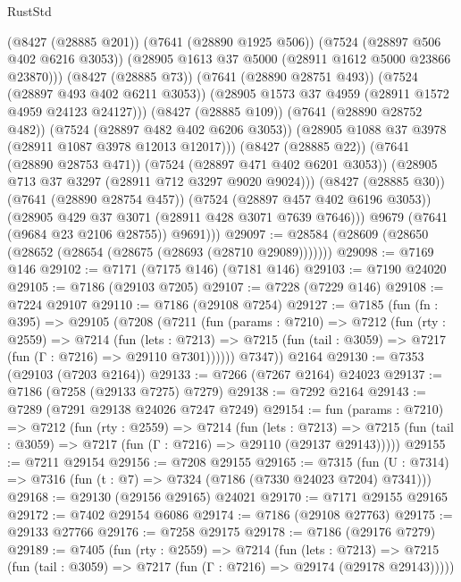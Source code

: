 \begin{lexlean}{RustStd}
\begin{coremodule}
                    (@8427 (@28885 @201))
                    (@7641 (@28890 @1925 @506))
                    (@7524 (@28897 @506 @402 @6216 @3053))
                    (@28905 @1613 @37 @5000 (@28911 @1612 @5000 @23866 @23870)))
                  (@8427 (@28885 @73))
                  (@7641 (@28890 @28751 @493))
                  (@7524 (@28897 @493 @402 @6211 @3053))
                  (@28905 @1573 @37 @4959 (@28911 @1572 @4959 @24123 @24127)))
                (@8427 (@28885 @109))
                (@7641 (@28890 @28752 @482))
                (@7524 (@28897 @482 @402 @6206 @3053))
                (@28905 @1088 @37 @3978 (@28911 @1087 @3978 @12013 @12017)))
              (@8427 (@28885 @22))
              (@7641 (@28890 @28753 @471))
              (@7524 (@28897 @471 @402 @6201 @3053))
              (@28905 @713 @37 @3297 (@28911 @712 @3297 @9020 @9024)))
            (@8427 (@28885 @30))
            (@7641 (@28890 @28754 @457))
            (@7524 (@28897 @457 @402 @6196 @3053))
            (@28905 @429 @37 @3071 (@28911 @428 @3071 @7639 @7646)))
          @9679
          (@7641 (@9684 @23 @2106 @28755))
          @9691)))
@29097 := @28584 (@28609 (@28650 (@28652 (@28654 (@28675 (@28693 (@28710 @29089)))))))
@29098 := @7169 @146
@29102 := @7171 (@7175 @146) (@7181 @146)
@29103 := @7190 @24020
@29105 := @7186 (@29103 @7205)
@29107 := @7228 (@7229 @146)
@29108 := @7224 @29107
@29110 := @7186 (@29108 @7254)
@29127 := @7185
    (fun (fn : @395) =>
    @29105
      (@7208
        (@7211
          (fun (params : @7210) =>
          @7212
            (fun (rty : @2559) =>
            @7214
              (fun (lets : @7213) =>
              @7215 (fun (tail : @3059) => @7217 (fun (Γ : @7216) => @29110 @7301))))))
        @7347))
    @2164
@29130 := @7353 (@29103 (@7203 @2164))
@29133 := @7266 (@7267 @2164) @24023
@29137 := @7186 (@7258 (@29133 @7275) @7279)
@29138 := @7292 @2164
@29143 := @7289 (@7291 @29138 @24026 @7247 @7249)
@29154 := fun (params : @7210) =>
  @7212
    (fun (rty : @2559) =>
    @7214
      (fun (lets : @7213) =>
      @7215 (fun (tail : @3059) => @7217 (fun (Γ : @7216) => @29110 (@29137 @29143)))))
@29155 := @7211 @29154
@29156 := @7208 @29155
@29165 := @7315
    (fun (U : @7314) => @7316 (fun (t : @7) => @7324 (@7186 (@7330 @24023 @7204) @7341)))
@29168 := @29130 (@29156 @29165) @24021
@29170 := @7171 @29155 @29165
@29172 := @7402 @29154 @6086
@29174 := @7186 (@29108 @27763)
@29175 := @29133 @27766
@29176 := @7258 @29175
@29178 := @7186 (@29176 @7279)
@29189 := @7405
    (fun (rty : @2559) =>
    @7214
      (fun (lets : @7213) =>
      @7215 (fun (tail : @3059) => @7217 (fun (Γ : @7216) => @29174 (@29178 @29143)))))

\end{coremodule}
\end{lexlean}
